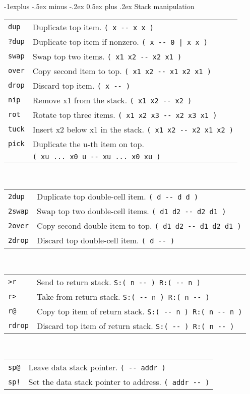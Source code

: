 \documentclass[10pt,landscape,a4paper]{article}
\makeatletter
\renewcommand{\subsection}{\@startsection{subsection}{2}{0mm}%
                                {-1explus -.5ex minus -.2ex}%
                                {0.5ex plus .2ex}%
                                {\normalfont\normalsize\bfseries}}
\newcommand{\compileonly}{\color{blue}}
\makeatother
\begin{document}
\begin{multicols}{3}
\subsection{Stack manipulation}
\begin{tabular}{@{}ll@{}}
\verb!dup!  & Duplicate top item. \verb!( x -- x x )! \\
\verb!?dup!  & Duplicate top item if nonzero. \verb!( x -- 0 | x x )! \\
\verb!swap!  & Swap top two items. \verb!( x1 x2 -- x2 x1 )! \\
\verb!over!  & Copy second item to top. \verb!( x1 x2 -- x1 x2 x1 )! \\
\verb!drop!  & Discard top item. \verb!( x -- )! \\
\verb!nip!  & Remove x1 from the stack. \verb!( x1 x2 -- x2 )! \\
\verb!rot!  & Rotate top three items. \verb!( x1 x2 x3 -- x2 x3 x1 )! \\
\verb!tuck!  & Insert x2 below x1 in the stack. \verb!( x1 x2 -- x2 x1 x2 )! \\
\verb!pick!  & Duplicate the u-th item on top. \\
             & \verb!( xu ... x0 u -- xu ... x0 xu )! \\
\end{tabular} \\
\begin{tabular}{@{}ll@{}}
\verb!2dup!  & Duplicate top double-cell item. \verb!( d -- d d )! \\
\verb!2swap!  & Swap top two double-cell items. \verb!( d1 d2 -- d2 d1 )! \\
\verb!2over!  & Copy second double item to top. \verb!( d1 d2 -- d1 d2 d1 )! \\
\verb!2drop!  & Discard top double-cell item. \verb!( d -- )! \\
\end{tabular} \\
\begin{tabular}{@{}ll@{}}
{\compileonly\verb!>r!}  & Send to return stack. \verb!S:( n -- ) R:( -- n )! \\
{\compileonly\verb!r>!}  & Take from return stack. \verb!S:( -- n ) R:( n -- )! \\
{\compileonly\verb!r@!}  & Copy top item of return stack. \verb!S:( -- n ) R:( n -- n )! \\
{\compileonly\verb!rdrop!}  & Discard top item of return stack. \verb!S:( -- ) R:( n -- )! \\
\end{tabular}\\
\begin{tabular}{@{}ll@{}}
\verb!sp@!  & Leave data stack pointer. \verb!( -- addr )! \\
\verb?sp!?  & Set the data stack pointer to address. \verb!( addr -- )! \\
\end{tabular}



\end{multicols}
\end{document}
